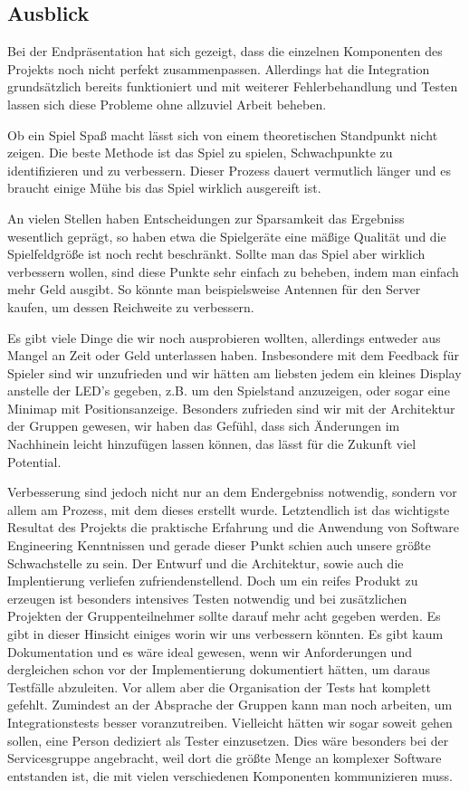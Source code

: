 \subsection{Ausblick}

Bei der Endpräsentation hat sich gezeigt, dass die einzelnen Komponenten des
Projekts noch nicht perfekt zusammenpassen. Allerdings hat die Integration
grundsätzlich bereits funktioniert und mit weiterer Fehlerbehandlung und
Testen lassen sich diese Probleme ohne allzuviel Arbeit beheben.

Ob ein Spiel Spaß macht lässt sich von einem theoretischen Standpunkt nicht
zeigen. Die beste Methode ist das Spiel zu spielen, Schwachpunkte zu
identifizieren und zu verbessern. Dieser Prozess dauert vermutlich länger und
es braucht einige Mühe bis das Spiel wirklich ausgereift ist.

An vielen Stellen haben Entscheidungen zur Sparsamkeit das Ergebniss wesentlich
geprägt, so haben etwa die Spielgeräte eine mäßige Qualität und die
Spielfeldgröße ist noch recht beschränkt. Sollte man das Spiel aber wirklich
verbessern wollen, sind diese Punkte sehr einfach zu beheben, indem man einfach
mehr Geld ausgibt. So könnte man beispielsweise Antennen für den Server kaufen,
um dessen Reichweite zu verbessern.

Es gibt viele Dinge die wir noch ausprobieren wollten, allerdings entweder aus
Mangel an Zeit oder Geld unterlassen haben. Insbesondere mit dem Feedback für
Spieler sind wir unzufrieden und wir hätten am liebsten jedem ein kleines
Display anstelle der LED's gegeben, z.B. um den Spielstand anzuzeigen, oder
sogar eine Minimap mit Positionsanzeige. Besonders zufrieden sind wir mit der
Architektur der Gruppen gewesen, wir haben das Gefühl, dass sich Änderungen im
Nachhinein leicht hinzufügen lassen können, das lässt für die Zukunft viel
Potential.

Verbesserung sind jedoch nicht nur an dem Endergebniss notwendig, sondern vor
allem am Prozess, mit dem dieses erstellt wurde. Letztendlich ist das wichtigste
Resultat des Projekts die praktische Erfahrung und die Anwendung von Software
Engineering Kenntnissen und gerade dieser Punkt schien auch unsere größte
Schwachstelle zu sein. Der Entwurf und die Architektur, sowie auch die
Implentierung verliefen zufriendenstellend. Doch um ein reifes Produkt zu
erzeugen ist besonders intensives Testen notwendig und bei zusätzlichen
Projekten der Gruppenteilnehmer sollte darauf mehr acht gegeben werden. Es gibt
in dieser Hinsicht einiges worin wir uns verbessern könnten. Es gibt kaum
Dokumentation und es wäre ideal gewesen, wenn wir Anforderungen und dergleichen
schon vor der Implementierung dokumentiert hätten, um daraus Testfälle
abzuleiten. Vor allem aber die Organisation der Tests hat komplett gefehlt.
Zumindest an der Absprache der Gruppen kann man noch arbeiten, um
Integrationstests besser voranzutreiben. Vielleicht hätten wir sogar soweit
gehen sollen, eine Person dediziert als Tester einzusetzen. Dies wäre
besonders bei der Servicesgruppe angebracht, weil dort die größte Menge an
komplexer Software entstanden ist, die mit vielen verschiedenen Komponenten
kommunizieren muss.

